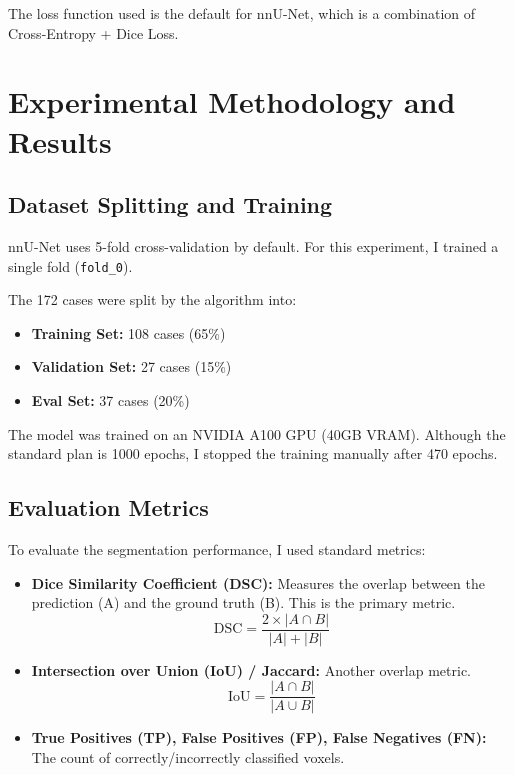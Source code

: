 \documentclass[11pt, a4paper]{article}
\begin{document}
The loss function used is the default for nnU-Net, which is a combination of Cross-Entropy + Dice Loss.

\section{Experimental Methodology and Results}

\subsection{Dataset Splitting and Training}

nnU-Net uses 5-fold cross-validation by default. For this experiment, I trained a single fold (\texttt{fold\_0}).

The 172 cases were split by the algorithm into:
\begin{itemize}
    \item \textbf{Training Set:} 108 cases (65\%) %
    \item \textbf{Validation Set:} 27 cases (15\%) %
    \item \textbf{Eval Set:} 37 cases (20\%) %

\end{itemize}

The model was trained on an NVIDIA A100 GPU (40GB VRAM). Although the standard plan is 1000 epochs, I stopped the training manually after 470 epochs.

\subsection{Evaluation Metrics}

To evaluate the segmentation performance, I used standard metrics:
\begin{itemize}
    \item \textbf{Dice Similarity Coefficient (DSC):} Measures the overlap between the prediction (A) and the ground truth (B). This is the primary metric. %
    \[ \text{DSC} = \frac{2 \times |A \cap B|}{|A| + |B|} \]
    \item \textbf{Intersection over Union (IoU) / Jaccard:} Another overlap metric. %
    \[ \text{IoU} = \frac{|A \cap B|}{|A \cup B|} \]
    \item \textbf{True Positives (TP), False Positives (FP), False Negatives (FN):} The count of correctly/incorrectly classified voxels. %
\end{itemize}
\end{document}

